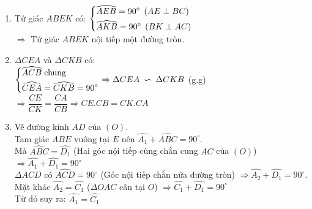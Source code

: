 \begin{ex}
{\begin{center}
\end{center}
    \begin{enumerate}
        \item Tứ giác $ABEK$ có: $\left\{\begin{aligned}&\widehat{AEB}=90^\circ\;\left(AE\perp BC\right)\\
        &\widehat{AKB}=90^\circ\;\left(BK\perp AC\right)\end{aligned}\right.$ \\
        $\Rightarrow $ Tứ giác $ABEK$ nội tiếp một đường tròn.
        \item $\Delta CEA$ và $\Delta CKB$ có:\\
        $\left\{\begin{aligned}&\widehat{ACB}\; \text{chung}\\&\widehat{CEA}=\widehat{CKB}=90^\circ\end{aligned}\right.\Rightarrow \Delta CEA\;\backsim\;\Delta CKB$ (g.g)\\ $\Rightarrow \dfrac{CE}{CK}=\dfrac{CA}{CB}\Rightarrow CE.CB=CK.CA$
        \item Vẽ đường kính $AD$ của $(O)$.\\
        Tam giác $ABE$ vuông tại $E$ nên $\widehat{A_1}+\widehat{ABC}=90^\circ$.\\
        Mà $\widehat{ABC}=\widehat{D_1}$ (Hai góc nội tiếp cùng chắn cung $AC$ của $(O)$)
        $\Rightarrow \widehat{A_1}+\widehat{D_1}=90^\circ$\\
        $\Delta ACD$ có $\widehat{ACD}=90^\circ$ (Góc nội tiếp chắn nửa đường tròn) $\Rightarrow \widehat{A_2}+\widehat{D_1}=90^\circ$.\\
        Mặt khác $\widehat{A_2}=\widehat{C_1}$ ($\Delta OAC$ cân tại $O$) $\Rightarrow \widehat{C_1}+\widehat{D_1}=90^\circ$\\
        Từ đó suy ra: $\widehat{A_1}=\widehat{C_1}$

\end{enumerate}}
\end{ex}
